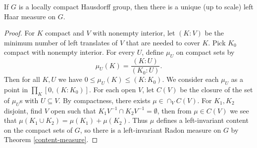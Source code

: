 \begin{thm} If $G$ is a locally compact Hausdorff group, then there is a unique (up to scale) left Haar measure on $G$.
\end{thm}
\begin{proof} For $K$ compact and $V$ with nonempty interior, let $(K:V)$ be the minimum number of left translates of $V$ that are needed to cover $K$. Pick $K_0$ compact with nonempty interior. For every $U$, define $\mu_U$ on compact sets by
\[
\mu_U(K) = \frac{(K:U)}{(K_0:U)}.
\]
Then for all $K,U$ we have $0 \le \mu_U(K) \le (K:K_0)$. We consider each $\mu_U$ as a point in $\prod_K [0,(K:K_0)]$. For each open $V$, let $C(V)$ be the closure of the set of $\mu_U$s with $U \subseteq V$. By compactness, there exists $\mu \in \cap_V C(V)$. For $K_1, K_2$ disjoint, find $V$ open such that $K_1V^{-1} \cap K_2V^{-1} = \emptyset$, then from $\mu \in C(V)$ we see that $\mu(K_1 \cup K_2) = \mu(K_1) + \mu(K_2)$. Thus $\mu$ defines a left-invariant content on the compact sets of $G$, so there is a left-invariant Radon measure on $G$ by Theorem \ref{content-measure}.




\end{proof}
